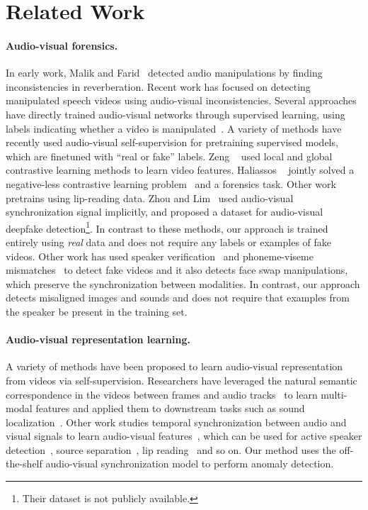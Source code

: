 \documentclass[10pt,twocolumn,letterpaper]{article}
\newcommand{\mypar}[1]{\vspace{-3mm}\paragraph{#1}}
\begin{document}
 
\section{Related Work}
\label{sec:related}


\paragraph{Audio-visual forensics.}
In early work, Malik and Farid~\cite{malik2010audio} detected audio manipulations by finding inconsistencies in reverberation. Recent work has focused on detecting manipulated speech videos using audio-visual inconsistencies.
Several approaches have directly trained audio-visual networks through supervised learning, using labels indicating whether a video is manipulated~\cite{mittal2020emotions, chugh2020not}. A variety of methods have recently used audio-visual self-supervision for pretraining supervised models, which are finetuned with ``real or fake'' labels. Zeng \etal~\cite{zeng2021contrastive} used local and global contrastive learning methods to learn video features. Haliassos \etal~\cite{haliassos2022leveraging} jointly solved a negative-less contrastive learning problem~\cite{grill2020bootstrap} and a forensics task. Other work~\cite{haliassos2021lips} pretrains using lip-reading data. Zhou and Lim~\cite{zhou2021joint} used audio-visual synchronization signal implicitly, and proposed a dataset for audio-visual deepfake detection\footnote{Their dataset is not publicly available.}. In contrast to these methods, our approach is trained entirely using {\em real} data and does not require any labels or examples of fake videos. Other work has used speaker verification~\cite{cozzolino2022audio} and phoneme-viseme mismatches~\cite{agarwal2020detecting} to detect fake videos and it also detects face swap manipulations, which preserve the synchronization between modalities. In contrast, our approach detects misaligned images and sounds and does not require that examples from the speaker be present in the training set.




\mypar{Audio-visual representation learning.} 
A variety of methods have been proposed to learn audio-visual representation from videos via self-supervision. Researchers have leveraged the natural semantic correspondence in the videos between frames and audio tracks~\cite{asano2020labelling,zeng2021contrastive,morgado2021audio} to learn multi-modal features and applied them to downstream tasks such as sound localization~\cite{hu2022mix,arandjelovic2018objects,mo2022_ezvsl}. Other work studies temporal synchronization between audio and visual signals to learn audio-visual features~\cite{chung2016out,owens2018audio,korbar2018cooperative}, which can be used for active speaker detection~\cite{tao2021someone,alcazar2021maas,kopuklu2021design}, source separation~\cite{majumder2021move2hear,gao2021visualvoice,zhou2020sep}, lip reading~\cite{afouras2020asr,martinez2020lipreading,ma2021towards} and so on. Our method uses the off-the-shelf audio-visual synchronization model to perform anomaly detection. 
\end{document}
